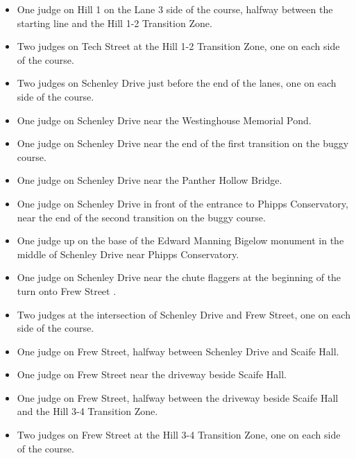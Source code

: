 	\begin{itemize}

		\item One judge on Hill 1 on the Lane 3 side of the course, halfway between
		the starting line and the Hill 1-2 Transition Zone.

		\item Two judges on Tech Street at the Hill 1-2 Transition Zone, one on
		each side of the course.

		\item Two judges on Schenley Drive just before the end of the lanes, one on
		each side of the course.

		\item One judge on Schenley Drive near the Westinghouse Memorial Pond.

		\item One judge on Schenley Drive near the end of the first transition on
		the buggy course.

		\item One judge on Schenley Drive near the Panther Hollow Bridge.

		\item One judge on Schenley Drive in front of the entrance to Phipps
		Conservatory, near the end of the second transition on the buggy course.

		\item One judge up on the base of the Edward Manning Bigelow monument in
		the middle of Schenley Drive near Phipps Conservatory.

		\item One judge on Schenley Drive near the chute flaggers at the beginning
		of the turn onto Frew Street .

		\item Two judges at the intersection of Schenley Drive and Frew Street, one
		on each side of the course.

		\item One judge on Frew Street, halfway between Schenley Drive and Scaife
		Hall.

		\item One judge on Frew Street near the driveway beside Scaife Hall.

		\item One judge on Frew Street, halfway between the driveway beside Scaife
		Hall and the Hill 3-4 Transition Zone.

		\item Two judges on Frew Street at the Hill 3-4 Transition Zone, one on
		each side of the course.


\end{itemize}
